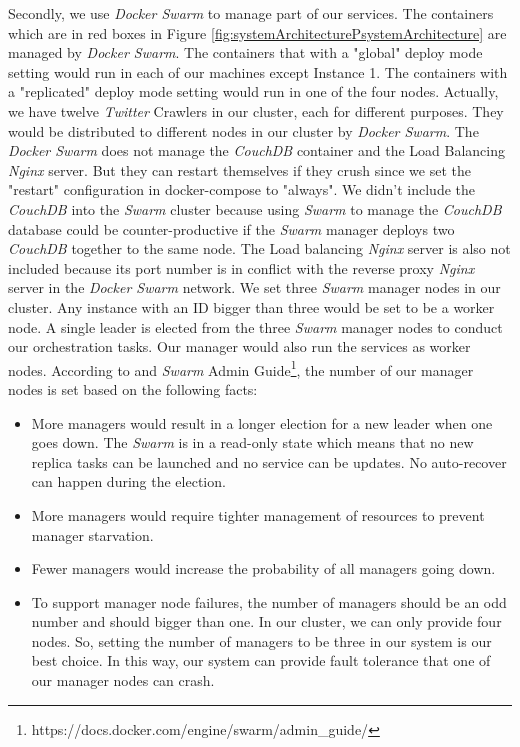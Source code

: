 \documentclass{article}
\begin{document}
Secondly, we use \textit{Docker Swarm} to manage part of our services. The containers which are in red boxes in Figure \ref{fig:systemArchitecturePsystemArchitecture} are managed by \textit{Docker Swarm}. The containers that with a "global" deploy mode setting would run in each of our machines except Instance 1. The containers with a "replicated" deploy mode setting would run in one of the four nodes. Actually, we have twelve \textit{Twitter} Crawlers in our cluster, each for different purposes. They would be distributed to different nodes in our cluster by \textit{Docker Swarm}. The \textit{Docker Swarm} does not manage the \textit{CouchDB} container and the Load Balancing \textit{Nginx} server. But they can restart themselves if they crush since we set the "restart" configuration in docker-compose to "always". We didn't include the \textit{CouchDB} into the \textit{Swarm} cluster because using \textit{Swarm} to manage the \textit{CouchDB} database could be counter-productive if the \textit{Swarm} manager deploys two \textit{CouchDB} together to the same node. The Load balancing \textit{Nginx} server is also not included because its port number is in conflict with the reverse proxy \textit{Nginx} server in the \textit{Docker Swarm} network. We set three \textit{Swarm} manager nodes in our cluster. Any instance with an ID bigger than three would be set to be a worker node. A single leader is elected from the three \textit{Swarm} manager nodes to conduct our orchestration tasks. Our manager would also run the services as worker nodes. According to \cite{pros-and-cons-of-running-all-docker-swarm-nodes-as-managers} and \textit{Swarm} Admin Guide\footnote{https://docs.docker.com/engine/swarm/admin\_guide/}, the number of our manager nodes is set based on the following facts:
\begin{itemize}
	\item More managers would result in a longer election for a new leader when one goes down. The \textit{Swarm} is in a read-only state which means that no new replica tasks can be launched and no service can be updates. No auto-recover can happen during the election.
	\item More managers would require tighter management of resources to prevent manager starvation.
	\item Fewer managers would increase the probability of all managers going down.
	\item To support manager node failures, the number of managers should be an odd number and should bigger than one. In our cluster, we can only provide four nodes. So, setting the number of managers to be three in our system is our best choice. In this way, our system can provide fault tolerance that one of our manager nodes can crash.
\end{itemize}
\end{document}
